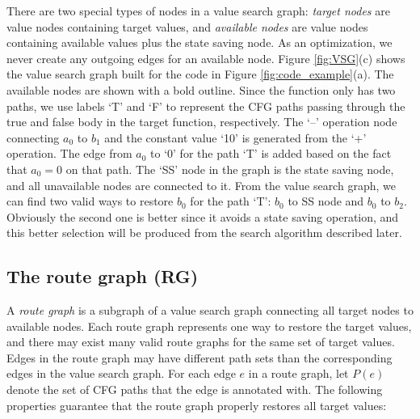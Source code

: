 \documentclass[12pt]{gatech-thesis}
\begin{document}
There are two special types of nodes in a value search graph: \emph{target nodes} are value nodes containing target values, and \emph{available nodes} are value nodes containing available values plus the state saving node.
As an optimization, we never create any outgoing edges for an available node. Figure \ref{fig:VSG}(c) shows the value search graph built for the code in Figure \ref{fig:code_example}(a). 
The available nodes are shown with a bold outline.
Since the function only has two paths, we use labels `T' and `F' to represent the CFG paths passing through the true and false body in the target function, respectively. 
The `--' operation node connecting $a_0$ to $b_1$ and the constant value `10' is generated from the `+' operation. 
The edge from $a_0$ to `0' for the path `T' is added based on the fact that $a_0 = 0$ on that path.
The `SS' node in the graph is the state saving node, and all unavailable nodes are connected to it. 
From the value search graph, we can find two valid ways to restore $b_0$ for the path `T': $b_0$ to SS node and $b_0$ to $b_2$. 
Obviously the second one is better since it avoids a state saving operation, and this better selection will be produced from the search algorithm described later.


\subsection{The route graph (RG)}
\label{sec:route-graph}

A \emph{route graph} is a subgraph of a value search graph connecting all target nodes to available nodes. Each route graph represents one way to restore the target values, and there may exist many valid route graphs for the same set of target values.
Edges in the route graph may have different path sets than the corresponding edges in the value search graph. 
For each edge $e$ in a route graph, let $P(e)$ denote the set of CFG paths that the edge is annotated with.
The following properties guarantee that the route graph properly restores all target values:
\end{document}
